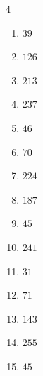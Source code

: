 \begin{multicols}{4}
\begin{enumerate}

  \item $39$


  \item $126$


  \item $213$


  \item $237$


  \item $46$


  \item $70$


  \item $224$


  \item $187$


  \item $45$


  \item $241$


  \item $31$


  \item $71$


\columnbreak %

\resetques

  \item $143$


  \item $255$


  \item $45$


\end{enumerate}
\end{multicols}
